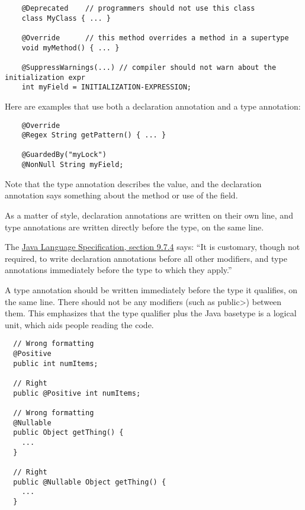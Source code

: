 \begin{Verbatim}
    @Deprecated    // programmers should not use this class
    class MyClass { ... }

    @Override      // this method overrides a method in a supertype
    void myMethod() { ... }

    @SuppressWarnings(...) // compiler should not warn about the initialization expr
    int myField = INITIALIZATION-EXPRESSION;
\end{Verbatim}

Here are examples that use both a declaration annotation and a type annotation:

\begin{Verbatim}
    @Override
    @Regex String getPattern() { ... }

    @GuardedBy("myLock")
    @NonNull String myField;
\end{Verbatim}

Note that the type annotation describes the value, and the declaration annotation says something about the method or use of the field.

As a matter of style, declaration annotations are written on their own line, and type annotations are written directly before the type, on the same line.



The
\href{https://docs.oracle.com/javase/specs/jls/se8/html/jls-9.html#jls-9.7.4}{Java
  Language Specification, section 9.7.4} says:  ``It is customary, though
not required, to write declaration annotations before all other modifiers,
and type annotations immediately before the type to which they apply.''

A type annotation should be written immediately before the type it
qualifies, on the same line.  There should not be any modifiers (such as
\<public>) between them.  This emphasizes that the type qualifier plus the
Java basetype is a logical unit, which aids people reading the code.

\begin{Verbatim}
  // Wrong formatting
  @Positive
  public int numItems;

  // Right
  public @Positive int numItems;

  // Wrong formatting
  @Nullable
  public Object getThing() {
    ...
  }

  // Right
  public @Nullable Object getThing() {
    ...
  }
\end{Verbatim}

